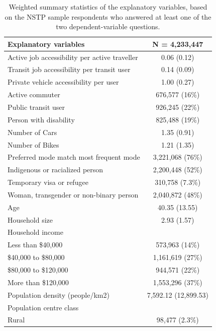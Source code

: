 \documentclass[preprint, 3p,
authoryear]{elsarticle} %
\begin{document}
\begin{table}

\caption{\label{tab:vardescriptions}\label{tab:var-description}Weighted summary statistics of the explanatory variables, based on the NSTP sample respondents who answered at least one
of the two dependent-variable questions.}
\centering
\begin{tabular}[t]{lc}
\toprule
Explanatory variables & \textbf{N = 4,233,447}\\
\midrule
Active job accessibility per active traveller & 0.06 (0.12)\\
Transit job accessibility per transit user & 0.14 (0.09)\\
Private vehicle accessibility per user & 1.00 (0.27)\\
Active commuter & 676,577 (16\%)\\
Public transit user & 926,245 (22\%)\\
\addlinespace
Person with disability & 825,488 (19\%)\\
Number of Cars & 1.35 (0.91)\\
Number of Bikes & 1.21 (1.35)\\
Preferred mode match most frequent mode & 3,221,068 (76\%)\\
Indigenous or racialized person & 2,200,448 (52\%)\\
\addlinespace
Temporary visa or refugee & 310,758 (7.3\%)\\
Woman, transgender or non-binary person & 2,040,872 (48\%)\\
Age & 40.35 (13.55)\\
Household size & 2.93 (1.57)\\
Household income & \\
\addlinespace
\hspace{1em}Less than \$40,000 & 573,963 (14\%)\\
\hspace{1em}\$40,000 to \$80,000 & 1,161,619 (27\%)\\
\hspace{1em}\$80,000 to \$120,000 & 944,571 (22\%)\\
\hspace{1em}More than \$120,000 & 1,553,296 (37\%)\\
Population density (people/km2) & 7,592.12 (12,899.53)\\
\addlinespace
Population centre class & \\
\hspace{1em}Rural & 98,477 (2.3\%)\\

\end{tabular}
\end{table}
\end{document}
